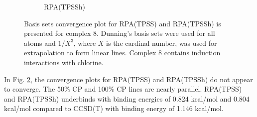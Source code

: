 \documentclass[11pt]{article}
\begin{document}
\begin{figure}[H]
\begin{subfigure}{.5\textwidth}
    \caption{RPA(TPSSh)}
    \label{fig:tpssh_8}
  \end{subfigure}
  \caption{Basis sets convergence plot for RPA(TPSS) and RPA(TPSSh) is
    presented for complex 8. Dunning's basis sets were used for all atoms
    and $1/X^3$, where $X$ is the cardinal number, was used for extrapolation
    to form linear lines. Complex 8 contains induction interactions with
    chlorine.}
  \label{fig:complex_8}
\end{figure}

In Fig. \ref{fig:complex_8}, the convergence plots for RPA(TPSS)
and RPA(TPSSh) do not appear to converge. The 50$\%$ CP and 100$\%$ CP
lines are nearly parallel. RPA(TPSS) and RPA(TPSSh) underbinds with
binding energies of 0.824 kcal/mol and 0.804 kcal/mol compared to CCSD(T)
with binding energy of 1.146 kcal/mol.
\end{document}
